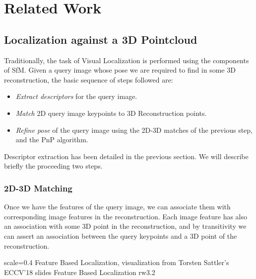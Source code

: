 

\chapter{Related Work}
\section{Localization against a 3D Pointcloud}
Traditionally, the task of Visual Localization is performed using the components of SfM. Given a query image whose pose we are required to find in some 3D reconstruction, the basic sequence of steps followed are:

\begin{itemize}
	\item \emph{Extract descriptors} for the query image.\\
	\item \textit{Match} 2D query image keypoints to 3D Reconstruction points.\\
	\item \textit{Refine pose} of the query image using the 2D-3D matches of the previous step, and the PnP algorithm.\\
\end{itemize}

Descriptor extraction has been detailed in the previous section. We will describe briefly the proceeding two steps. 

\subsection{2D-3D Matching}
Once we have the features of the query image, we can associate them with corresponding image features in the reconstruction. Each image feature has also an association with some 3D point in the reconstruction, and by transitivity we can assert an association between the query keypoints and a 3D point of the reconstruction.

{scale=0.4}%
{Feature Based Localization, visualization from Torsten Sattler's ECCV'18 slides}%
{Feature Based Localization}%
{rw3.2} %

